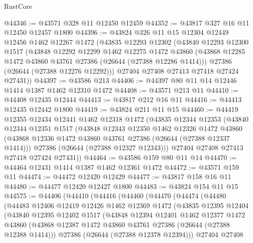 \begin{lexlean}{RustCore}
\begin{coremodule}
@44346 := @43571 @328 @11 @12450 @12459
@44352 := @43817 @327 @16 @11 @12450 @12457 @1800
@44396 := @43824
    @326
    @11
    @15
    @12304
    @12449
    @12456
    @1462
    @12267
    @1472
    (@43835
      @12293
      @12302
      (@43840
        @12293
        @12300
        @1517
        (@43848
          @12292
          @12299
          @1462
          @12275
          @1472
          @43860
          (@43868 @12285 @1472 @43860 @43761 @27386 (@26644 (@27388 @12286 @1414)))
          @27386
          (@26644 (@27388 @12276 @12292)))
        @27404
        @27408
        @27413
        @27418
        @27424
        @27431))
@44397 := @43586 @213
@44406 := @44397 @80 @11 @14 @12446 @1414 @1387 @1462 @12310 @1472
@44408 := @43571 @213 @11
@44410 := @44408 @12435 @12444
@44413 := @43817 @212 @16 @11
@44416 := @44413 @12435 @12442 @1800
@44419 := @43824 @211 @11 @15
@44460 := @44419
    @12355
    @12434
    @12441
    @1462
    @12318
    @1472
    (@43835
      @12344
      @12353
      (@43840
        @12344
        @12351
        @1517
        (@43848
          @12343
          @12350
          @1462
          @12326
          @1472
          @43860
          (@43868 @12336 @1472 @43860 @43761 @27386 (@26644 (@27388 @12337 @1414)))
          @27386
          (@26644 (@27388 @12327 @12343)))
        @27404
        @27408
        @27413
        @27418
        @27424
        @27431))
@44464 := @43586 @159 @80 @11 @14
@44470 := @44464 @12431 @1414 @1387 @1462 @12361 @1472
@44472 := @43571 @159 @11
@44474 := @44472 @12420 @12429
@44477 := @43817 @158 @16 @11
@44480 := @44477 @12420 @12427 @1800
@44483 := @43824 @154 @11 @15
@44575 := @44406
    (@44410
      (@44416
        (@44460
          (@44470
            (@44474
              (@44480
                (@44483
                  @12406
                  @12419
                  @12426
                  @1462
                  @12369
                  @1472
                  (@43835
                    @12395
                    @12404
                    (@43840
                      @12395
                      @12402
                      @1517
                      (@43848
                        @12394
                        @12401
                        @1462
                        @12377
                        @1472
                        @43860
                        (@43868 @12387 @1472 @43860 @43761 @27386 (@26644 (@27388 @12388 @1414)))
                        @27386
                        (@26644 (@27388 @12378 @12394)))
                      @27404
                      @27408

\end{coremodule}
\end{lexlean}
